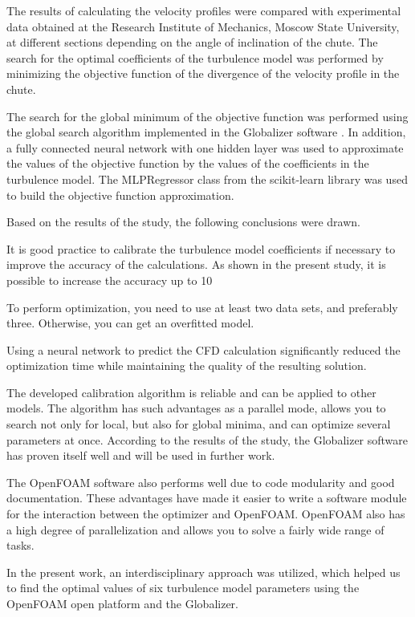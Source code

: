 \documentclass[mathematics,article,submit,pdftex,moreauthors]{Definitions/mdpi}
\begin{document}
The results of calculating the velocity profiles were compared with experimental data obtained at the Research Institute of Mechanics, Moscow State University, at different sections depending on the angle of inclination of the chute. The search for the optimal coefficients of the turbulence model was performed by minimizing the objective function of the divergence of the velocity profile in the chute. %

The search for the global minimum of the objective function was performed using the global search algorithm implemented in the Globalizer software \cite{globalizerSystem}. In addition, a fully connected neural network with one hidden layer was used to approximate the values of the objective function by the values of the coefficients in the turbulence model. The MLPRegressor class from the scikit-learn library was used to build the objective function approximation.

Based on the results of the study, the following conclusions were drawn.

It is good practice to calibrate the turbulence model coefficients if necessary to improve the accuracy of the calculations. As shown in the present study, it is possible to increase the accuracy up to 10%

To perform optimization, you need to use at least two data sets, and preferably three. Otherwise, you can get an overfitted model.

Using a neural network to predict the CFD calculation significantly reduced the optimization time while maintaining the quality of the resulting solution.

The developed calibration algorithm is reliable and can be applied to other models. The algorithm has such advantages as a parallel mode, allows you to search not only for local, but also for global minima, and can optimize several parameters at once. According to the results of the study, the Globalizer software has proven itself well and will be used in further work.

The OpenFOAM software also performs well due to code modularity and good documentation. These advantages have made it easier to write a software module for the interaction between the optimizer and OpenFOAM. OpenFOAM also has a high degree of parallelization and allows you to solve a fairly wide range of tasks.

In the present work, an interdisciplinary approach was utilized, which helped us to find the optimal values of six turbulence model parameters using the OpenFOAM open platform and the Globalizer.  
\end{document}

